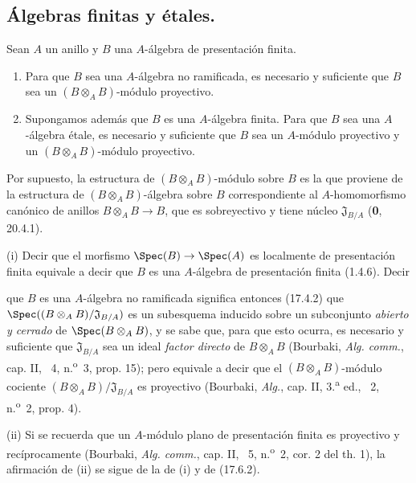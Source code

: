 \subsection{Álgebras finitas y étales.}
\label{subsection:IV.18.3}

\begin{proposition}[18.3.1]
\label{IV.18.3.1}
Sean $A$ un anillo y $B$ una $A$-álgebra de presentación finita.
\begin{enumerate}
  \item[\textup{(i)}] Para que $B$ sea una $A$-álgebra no ramificada, es necesario y suficiente que $B$ sea un $(B\otimes_A B)$-módulo proyectivo.
  \item[\textup{(ii)}] Supongamos además que $B$ es una $A$-álgebra finita. Para que $B$ sea una $A$-álgebra étale, es necesario y suficiente que $B$ sea un $A$-módulo proyectivo y un $(B\otimes_A B)$-módulo proyectivo.
\end{enumerate}
\end{proposition}

Por supuesto, la estructura de $(B\otimes_A B)$-módulo sobre $B$ es la que proviene de la estructura de $(B\otimes_A B)$-álgebra sobre $B$ correspondiente al $A$-homomorfismo canónico de anillos $B\otimes_A B\to B$, que es sobreyectivo y tiene núcleo $\mathfrak J_{B/A}$ (\textbf 0, 20.4.1).

(i) Decir que el morfismo $\Spec(B)\to\Spec(A)$ es localmente de presentación finita equivale a decir que $B$ es una $A$-álgebra de presentación finita (1.4.6). Decir


que $B$ es una $A$-álgebra no ramificada significa entonces (17.4.2) que $\Spec((B\otimes_A B)/\mathfrak J_{B/A})$ es un subesquema inducido sobre un subconjunto \emph{abierto y cerrado} de $\Spec(B\otimes_A B)$, y se sabe que, para que esto ocurra, es necesario y suficiente que $\mathfrak J_{B/A}$ sea un ideal \emph{factor directo} de $B\otimes_A B$ (Bourbaki, \emph{Alg. comm.}, cap. II, \textsection~4, n.\textsuperscript{o}~3, prop. 15); pero equivale a decir que el $(B\otimes_A B)$-módulo cociente $(B\otimes_A B)/\mathfrak J_{B/A}$ es proyectivo (Bourbaki, \emph{Alg.}, cap. II, 3.\textsuperscript{a} ed., \textsection~2, n.\textsuperscript{o}~2, prop. 4).

(ii) Si se recuerda que un $A$-módulo plano de presentación finita es proyectivo y recíprocamente (Bourbaki, \emph{Alg. comm.}, cap. II, \textsection~5, n.\textsuperscript{o}~2, cor. 2 del th. 1), la afirmación de (ii) se sigue de la de (i) y de (17.6.2).

